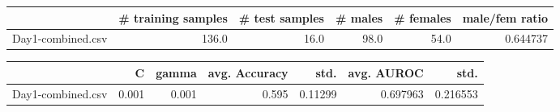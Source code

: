 \begin{tabular}{lrrrrr}
\hline
{} &  \# training samples &  \# test samples &  \# males &  \# females &  male/fem ratio \\
\hline
Day1-combined.csv &               136.0 &            16.0 &     98.0 &       54.0 &        0.644737 \\
\hline
\end{tabular}
\begin{tabular}{lrrrrrr}
\hline
{} &      C &  gamma &  avg. Accuracy &     std. &  avg. AUROC &      std. \\
\hline
Day1-combined.csv &  0.001 &  0.001 &          0.595 &  0.11299 &    0.697963 &  0.216553 \\
\hline
\end{tabular}
